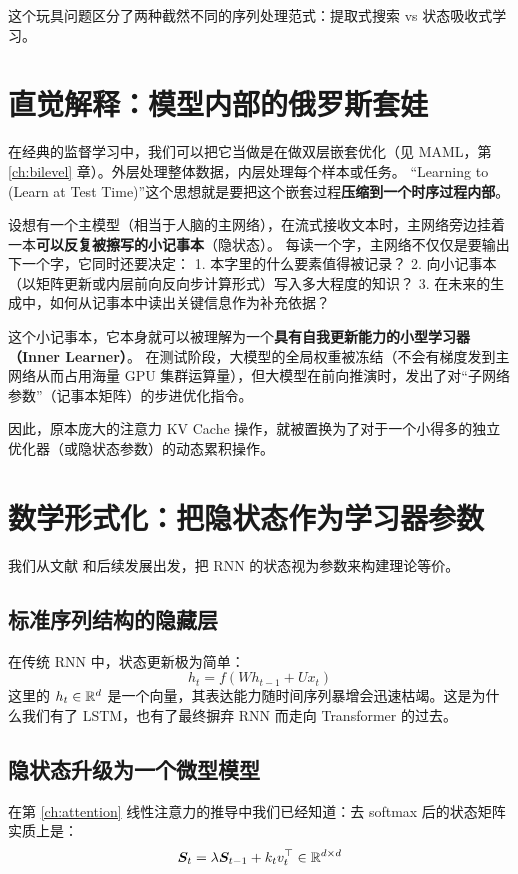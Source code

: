 这个玩具问题区分了两种截然不同的序列处理范式：提取式搜索 vs 状态吸收式学习。

\section{直觉解释：模型内部的俄罗斯套娃}
\label{sec:l2l_intuition}

在经典的监督学习中，我们可以把它当做是在做双层嵌套优化（见 MAML，第 \ref{ch:bilevel} 章）。外层处理整体数据，内层处理每个样本或任务。
“Learning to (Learn at Test Time)”这个思想就是要把这个嵌套过程\textbf{压缩到一个时序过程内部}。

设想有一个主模型（相当于人脑的主网络），在流式接收文本时，主网络旁边挂着一本\textbf{可以反复被擦写的小记事本}（隐状态）。
每读一个字，主网络不仅仅是要输出下一个字，它同时还要决定：
1. 本字里的什么要素值得被记录？
2. 向小记事本（以矩阵更新或内层前向反向步计算形式）写入多大程度的知识？
3. 在未来的生成中，如何从记事本中读出关键信息作为补充依据？

这个小记事本，它本身就可以被理解为一个\textbf{具有自我更新能力的小型学习器（Inner Learner）}。
在测试阶段，大模型的全局权重被冻结（不会有梯度发到主网络从而占用海量 GPU 集群运算量），但大模型在前向推演时，发出了对“子网络参数”（记事本矩阵）的步进优化指令。

因此，原本庞大的注意力 KV Cache 操作，就被置换为了对于一个小得多的独立优化器（或隐状态参数）的动态累积操作。

\section{数学形式化：把隐状态作为学习器参数}
\label{sec:l2l_math}

我们从文献 \citet{sun2023learning} 和后续发展出发，把 RNN 的状态视为参数来构建理论等价。

\subsection{标准序列结构的隐藏层}
在传统 RNN 中，状态更新极为简单：
\begin{equation}
  h_t = f(W h_{t-1} + U x_t)
\end{equation}
这里的 $h_t \in \mathbb{R}^d$ 是一个向量，其表达能力随时间序列暴增会迅速枯竭。这是为什么我们有了 LSTM，也有了最终摒弃 RNN 而走向 Transformer 的过去。

\subsection{隐状态升级为一个微型模型}
在第 \ref{ch:attention} 线性注意力的推导中我们已经知道：去 softmax 后的状态矩阵实质上是：
\begin{equation}
  \boldsymbol{S}_t = \lambda \boldsymbol{S}_{t-1} + k_t v_t^\top \in \mathbb{R}^{d \times d}
\end{equation}

